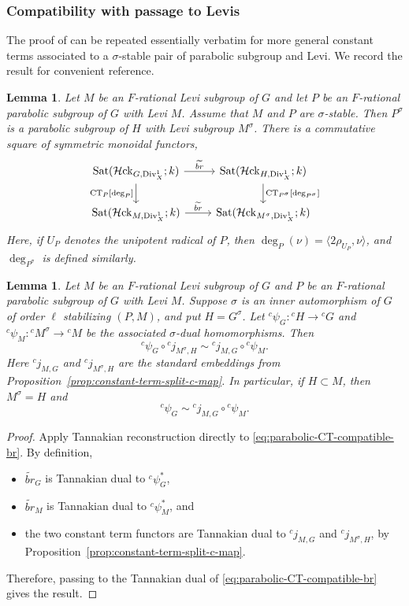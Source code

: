 \documentclass[reqno]{amsart}
\numberwithin{equation}{subsection}
\newcommand{\wt}[1]{\widetilde{#1}}
\newcommand{\co}{\colon}
\newcommand{\mrm}[1]{\mathrm{#1}}
\newcommand{\lc}{{}^c}
\DeclareMathOperator{\Div}{Div}
\DeclareMathOperator{\Sat}{Sat}
\newcommand{\cHck}{\mathcal{H}\mrm{ck}}
\DeclareMathOperator{\CT}{CT}
\newcommand{\cbr}{br}
\newtheorem{lemma}[thm]{Lemma}
\theoremstyle{remark}
\numberwithin{equation}{subsection}
\numberwithin{figure}{subsection}
\begin{document}
\subsubsection{Compatibility with passage to Levis}
The proof of \cite[Lemma 5.5.2]{F24} can be repeated essentially verbatim for more general constant terms associated to a $\sigma$-stable pair of parabolic subgroup and Levi. We record the result for convenient reference.

\begin{lemma}\label{lem:parabolic-CT-compatible-br}
Let $M$ be an $F$-rational Levi subgroup of $G$ and let $P$ be an $F$-rational parabolic subgroup of $G$ with Levi $M$. Assume that $M$ and $P$ are $\sigma$-stable. Then $P^\sigma$ is a parabolic subgroup of $H$ with Levi subgroup $M^\sigma$. There is a commutative square of symmetric monoidal functors, 
\begin{equation}\label{eq:parabolic-CT-compatible-br}
\begin{tikzcd}
\Sat(\cHck_{G, \Div_X^1};k) \ar[r, "\wt{\cbr}"] \ar[d, "{\CT_P[\deg_P]}"']  &  \Sat(\cHck_{H, \Div_X^1};k)  \ar[d, "{\CT_{P^\sigma}[\deg_{P^\sigma}]}"] \\
\Sat(\cHck_{M, \Div_X^1};k) \ar[r, "\wt{\cbr}"]  &  \Sat(\cHck_{M^\sigma, \Div_X^1};k) 
\end{tikzcd}
\end{equation}
Here, if $U_P$ denotes the unipotent radical of $P$, then $\deg_P(\nu)=\langle 2\rho_{U_P},\nu\rangle$, and $\deg_{P^\sigma}$ is defined similarly.
\end{lemma}




\begin{lemma}\label{lem:H-in-Levi}
Let $M$ be an $F$-rational Levi subgroup of $G$ and $P$ be an $F$-rational parabolic subgroup of $G$ with Levi $M$. Suppose $\sigma$ is an inner automorphism of $G$ of order $\ell$ stabilizing $(P,M)$, and put $H=G^\sigma$. Let $\lc \psi_G \co \lc H \rightarrow \lc G$ and $\lc \psi_M \co \lc M^\sigma \rightarrow \lc M$ be the associated $\sigma$-dual homomorphisms. Then
\[
\lc\psi_G\circ\lc j_{M^\sigma,H}\sim\lc j_{M,G}\circ\lc\psi_M.
\]
Here $\lc j_{M,G}$ and $\lc j_{M^\sigma,H}$ are the standard embeddings from Proposition~\ref{prop:constant-term-split-c-map}. In particular, if $H\subset M$, then $M^\sigma=H$ and
\[
\lc\psi_G\sim\lc j_{M,G}\circ\lc\psi_M.
\]
\end{lemma}

\begin{proof}
Apply Tannakian reconstruction directly to \eqref{eq:parabolic-CT-compatible-br}.
By definition,
\begin{itemize}
\item $\wt{\cbr}_G$ is Tannakian dual to $\lc \psi_G^*$,
\item $\wt{\cbr}_M$ is Tannakian dual to $\lc \psi_M^*$, and
\item the two constant term functors are Tannakian dual to $\lc j_{M,G}$ and $\lc j_{M^\sigma,H}$, by Proposition~\ref{prop:constant-term-split-c-map}.
\end{itemize} 
Therefore, passing to the Tannakian dual of \eqref{eq:parabolic-CT-compatible-br} gives the result.
\end{proof}
\end{document}
